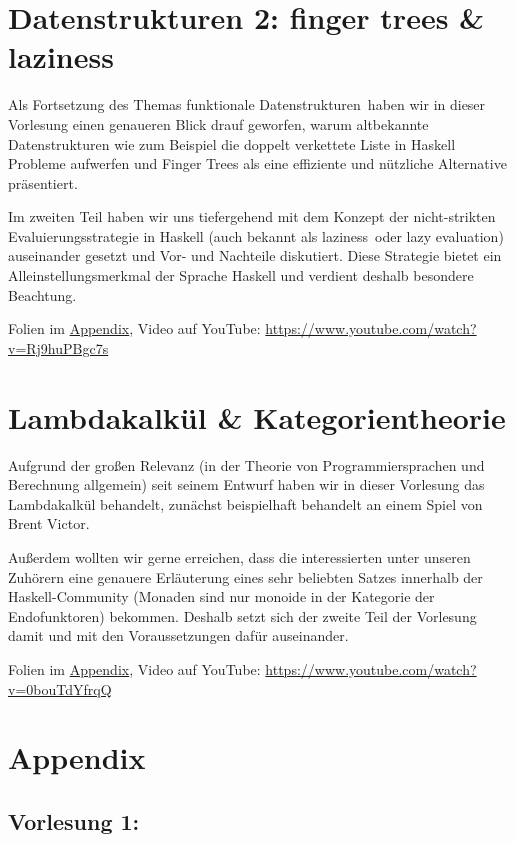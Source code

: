 \documentclass[10pt,a4paper]{article}
\begin{document}
\section{Datenstrukturen 2: finger trees \& laziness}

Als Fortsetzung des Themas \glqq funktionale Datenstrukturen\grqq\ haben wir in dieser Vorlesung einen genaueren Blick drauf geworfen, warum altbekannte Datenstrukturen wie zum Beispiel die doppelt verkettete Liste in Haskell Probleme aufwerfen und Finger Trees als eine effiziente und nützliche Alternative präsentiert.
\smallskip\smallskip

Im zweiten Teil haben wir uns tiefergehend mit dem Konzept der nicht-strikten Evaluierungsstrategie in Haskell (auch bekannt als \glqq laziness\grqq\ oder \glqq lazy evaluation\grqq) auseinander gesetzt und Vor- und Nachteile diskutiert. Diese Strategie bietet ein Alleinstellungsmerkmal der Sprache Haskell und verdient deshalb besondere Beachtung.

\bigskip
Folien im \hyperref[v10]{Appendix}, Video auf YouTube: \;\url{https://www.youtube.com/watch?v=Rj9huPBgc7s}

\section{Lambdakalkül \& Kategorientheorie}

Aufgrund der großen Relevanz (in der Theorie von Programmiersprachen und Berechnung allgemein) seit seinem Entwurf haben wir in dieser Vorlesung das Lambdakalkül behandelt, zunächst beispielhaft behandelt an einem Spiel von Brent Victor.
\smallskip\smallskip

Außerdem wollten wir gerne erreichen, dass die interessierten unter unseren Zuhörern eine
genauere Erläuterung eines sehr beliebten Satzes innerhalb der Haskell-Community (\glqq Monaden sind nur monoide in der Kategorie der Endofunktoren\grqq) bekommen. Deshalb setzt sich der zweite Teil der Vorlesung damit und mit den Voraussetzungen dafür auseinander.

\bigskip
Folien im \hyperref[v11]{Appendix}, Video auf YouTube: \;\url{https://www.youtube.com/watch?v=0bouTdYfrqQ}

\newpage
\section{Appendix}

\subsection*{Vorlesung 1:}
\label{v1}

\end{document}
